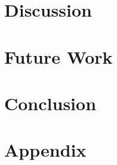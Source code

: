\documentclass{article}
\begin{document}
\section{Discussion}

\section{Future Work}

\section{Conclusion}








\newpage
\section{Appendix}

\end{document}
